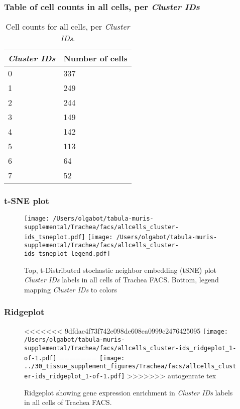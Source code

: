 \subsubsection{Table of cell counts in all cells, per \emph{Cluster IDs}}\begin{table}[h]
\centering
\label{my-label}
\begin{tabular}{@{}ll@{}}
\toprule

\emph{Cluster IDs}& Number of cells \\ \midrule
0 & 337 \\

1 & 249 \\

2 & 244 \\

3 & 149 \\

4 & 142 \\

5 & 113 \\

6 & 64 \\

7 & 52 \\
\bottomrule
\end{tabular}
\caption{Cell counts for all cells, per \emph{Cluster IDs}.}
\end{table}

\clearpage
\subsubsection{t-SNE plot}
\begin{figure}[h]
\centering
\texttt{[image: /Users/olgabot/tabula-muris-supplemental/Trachea/facs/allcells\_cluster-ids\_tsneplot.pdf]}
\texttt{[image: /Users/olgabot/tabula-muris-supplemental/Trachea/facs/allcells\_cluster-ids\_tsneplot\_legend.pdf]}
\caption{Top, t-Distributed stochastic neighbor embedding (tSNE) plot  \emph{Cluster IDs} labels in all cells of Trachea FACS. Bottom, legend mapping \emph{Cluster IDs} to colors}
\end{figure}


\clearpage

\subsubsection{Ridgeplot}
\begin{figure}[h]
\centering
<<<<<<< 9dfdae4f73f742e098de608ea0999c2476425095
\texttt{[image: /Users/olgabot/tabula-muris-supplemental/Trachea/facs/allcells\_cluster-ids\_ridgeplot\_1-of-1.pdf]}
=======
\texttt{[image: ../30\_tissue\_supplement\_figures/Trachea/facs/allcells\_cluster-ids\_ridgeplot\_1-of-1.pdf]}
>>>>>>> autogenrate tex

\caption{ Ridgeplot  showing gene expression enrichment in \emph{Cluster IDs} labels in all cells of Trachea FACS. }
\end{figure}


